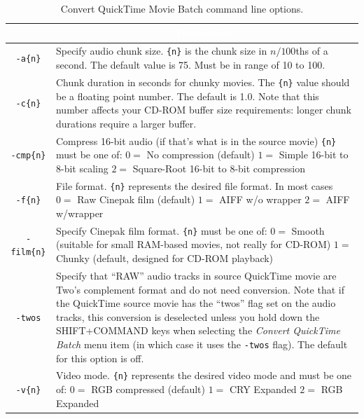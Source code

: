 \documentclass[12pt,letterpaper,twoside]{article}
\newcommand{\tabheadtxt}[1]{\multicolumn{1}{c}{\textcolor{white}{\textbf{#1}}}}
\begin{document}
\begin{table}[h]
\centering
\begin{tabular}{|c|p{11cm}|}
\hline
\rowcolor{black}
\tabheadtxt{Option} & \tabheadtxt{Description} \\
\hline
\texttt{-a\{n\}} & Specify audio chunk size. \texttt{\{n\}} is the chunk size in $n/100$ths of a second. The default
  value is 75. Must be in range of 10 to 100. \\
\hline
\texttt{-c\{n\}} & Chunk duration in seconds for chunky movies. The \texttt{\{n\}} value should be a floating
  point number. The default is 1.0. Note that this number affects your CD-ROM buffer size
  requirements: longer chunk durations require a larger buffer. \\
\hline
\texttt{-cmp\{n\}} & Compress 16-bit audio (if that's what is in the source movie) \texttt{\{n\}} must be one of:
  \newline $0 = $ No compression (default)
  \newline $1 = $ Simple 16-bit to 8-bit scaling
  \newline $2 = $ Square-Root 16-bit to 8-bit compression \\
\hline
\texttt{-f\{n\}} & File format. \texttt{\{n\}} represents the desired file format. In most cases
  \newline $0 = $ Raw Cinepak film (default)
  \newline $1 = $ AIFF w/o wrapper
  \newline $2 = $ AIFF w/wrapper \\
\hline
\texttt{-film\{n\}} & Specify Cinepak film format. \texttt{\{n\}} must be one of:
  \newline $0 = $ Smooth (suitable for small RAM-based movies, not really for CD-ROM)
  \newline $1 = $ Chunky (default, designed for CD-ROM playback) \\
\hline
\texttt{-twos} & Specify that ``RAW'' audio tracks in source QuickTime movie are Two's complement
  format and do not need conversion. Note that if the QuickTime source movie has the
  ``twos'' flag set on the audio tracks, this conversion is deselected unless you hold down
  the SHIFT+COMMAND keys when selecting the \textit{Convert QuickTime Batch} menu item (in
  which case it uses the \texttt{-twos} flag). The default for this option is off. \\
\hline
\texttt{-v\{n\}} & Video mode. \texttt{\{n\}} represents the desired video mode and must be one of:
  \newline $0 = $ RGB compressed (default)
  \newline $1 = $ CRY Expanded
  \newline $2 = $ RGB Expanded \\
\hline
\end{tabular}
\caption{Convert QuickTime Movie Batch command line options.}
\label{tab:batchopts}
\end{table}
\FloatBarrier
\end{document}
